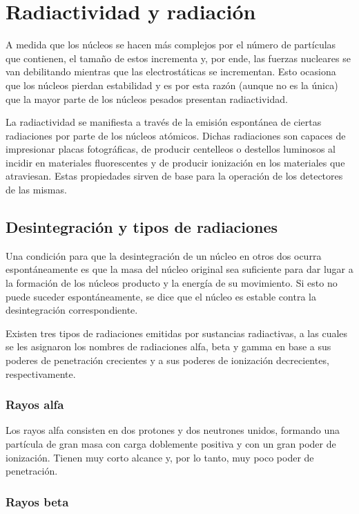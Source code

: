 \chapter{Radiactividad y radiación}

A medida que los núcleos se hacen más complejos por el número de partículas que contienen, el tamaño de estos incrementa y, por ende, las fuerzas nucleares se van debilitando mientras que las electrostáticas se incrementan. Esto ocasiona que los núcleos pierdan estabilidad y es por esta razón (aunque no es la única) que la mayor parte de los núcleos pesados presentan radiactividad.

La radiactividad se manifiesta a través de la emisión espontánea de ciertas radiaciones por parte de los núcleos atómicos. Dichas radiaciones son capaces de impresionar placas fotográficas, de producir centelleos o destellos luminosos al incidir en materiales fluorescentes y de producir ionización en los materiales que atraviesan. Estas propiedades sirven de base para la operación de los detectores de las mismas.

\section{Desintegración y tipos de radiaciones}

Una condición para que la desintegración de un núcleo en otros dos ocurra espontáneamente es que la masa del núcleo original sea suficiente para dar lugar a la formación de los núcleos producto y la energía de su movimiento. Si esto no puede suceder espontáneamente, se dice que el núcleo es estable contra la desintegración correspondiente.

Existen tres tipos de radiaciones emitidas por sustancias radiactivas, a las cuales se les asignaron los nombres de radiaciones alfa, beta y gamma en base a sus poderes de penetración crecientes y a sus poderes de ionización decrecientes, respectivamente.

\subsection{Rayos alfa}

Los rayos alfa consisten en dos protones y dos neutrones unidos, formando una partícula de gran masa con carga doblemente positiva y con un gran poder de ionización. Tienen muy corto alcance y, por lo tanto, muy poco poder de penetración.

\subsection{Rayos beta}

